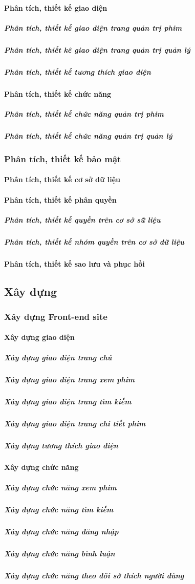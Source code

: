 \documentclass[a4paper]{book}
\begin{document}
\paragraph{Phân tích, thiết kế giao diện}
\subparagraph{Phân tích, thiết kế giao diện trang quản trị phim}
\subparagraph{Phân tích, thiết kê giao diện trang quản trị quản lý}
\subparagraph{Phân tích, thiết kế tương thích giao diện}
\paragraph{Phân tích, thiết kế chức năng}
\subparagraph{Phân tích, thiết kế chức năng quản trị phim}
\subparagraph{Phân tích, thiết kế chức năng quản trị quản lý}
\subsubsection{Phân tích, thiết kế bảo mật}
\paragraph{Phân tích, thiết kế cơ sở dữ liệu}
\paragraph{Phân tích, thiết kế phân quyền}
\subparagraph{Phân tích, thiết kế quyền trên cơ sở sữ liệu}
\subparagraph{Phân tích, thiết kế nhóm quyền trên cơ sở dữ liệu}
\paragraph{Phân tích, thiết kế sao lưu và phục hồi}
\subsection{Xây dựng}
\subsubsection{Xây dựng Front-end site}
\paragraph{Xây dựng giao diện}
\subparagraph{Xây dựng giao diện trang chủ}
\subparagraph{Xây dựng giao diện trang xem phim}
\subparagraph{Xây dựng giao diện trang tìm kiếm}
\subparagraph{Xây dựng giao diện trang chi tiết phim}
\subparagraph{Xây dựng tương thích giao diện}
\paragraph{Xây dựng chức năng}
\subparagraph{Xây dựng chức năng xem phim}
\subparagraph{Xây dựng chức năng tìm kiếm}
\subparagraph{Xây dựng chức năng đăng nhập}
\subparagraph{Xây dựng chức năng bình luận}
\subparagraph{Xây dựng chức năng theo dõi sở thích người dùng}
\end{document}
